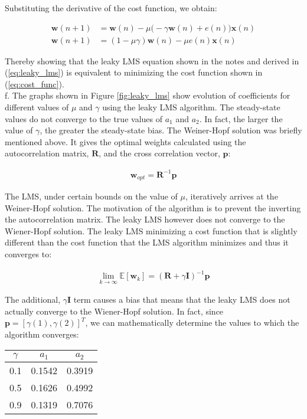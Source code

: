 \noindent{}Substituting the derivative of the cost function, we obtain:

\begin{align}
\textbf{w}(n+1) &= \textbf{w}(n) - \mu \Bigg(-\gamma \textbf{w}(n) + e(n)\Bigg)\textbf{x}(n) \nonumber\\
\textbf{w}(n+1) &= (1-\mu\gamma)\textbf{w}(n) - \mu e(n)\textbf{x}(n) \label{eq:leaky_lms}
\end{align}

\noindent{}Thereby showing that the leaky LMS equation shown in the notes and derived in (\ref{eq:leaky_lms}) is equivalent to minimizing the cost function shown in (\ref{eq:cost_func}).\\

\noindent{}f. The graphs shown in Figure \ref{fig:leaky_lms} show evolution of coefficients for different values of $\mu$ and $\gamma$ using the leaky LMS algorithm. The steady-state values do not converge to the true values of $a_1$ and $a_2$. In fact, the larger the value of $\gamma$, the greater the steady-state bias. The Weiner-Hopf solution was briefly mentioned above. It gives the optimal weights calculated using the autocorrelation matrix, $\textbf{R}$, and the cross correlation vector, $\textbf{p}$:

\begin{align*}
\textbf{w}_{opt} = \textbf{R}^{-1}\textbf{p}
\end{align*}

\noindent{}The LMS, under certain bounds on the value of $\mu$, iteratively arrives at the Weiner-Hopf solution. The motivation of the algorithm is to prevent the inverting the autocorrelation matrix. The leaky LMS however does not converge to the Wiener-Hopf solution. The leaky LMS minimizing a cost function that is slightly different than the cost function that the LMS algorithm minimizes and thus it converges to:

\begin{align*}
\lim_{k \rightarrow \infty} \mathbb{E}[\textbf{w}_{k}] = (\textbf{R} + \gamma\textbf{I})^{-1}\textbf{p}
\end{align*}

\noindent{}The additional, $\gamma\textbf{I}$ term causes a bias that means that the leaky LMS does not actually converge to the Wiener-Hopf solution. In fact, since $\textbf{p} = [\gamma(1), \gamma(2)]^T$, we can mathematically determine the values to which the algorithm converges:

\begin{table}[H]
\centering
\label{my-label}
\begin{tabular}{|c|c|c|}
\hline
$\gamma$ & $a_1$     & $a_2$     \\ \hline
0.1   & 0.1542 & 0.3919 \\ \hline
0.5   & 0.1626 & 0.4992 \\ \hline
0.9   & 0.1319 & 0.7076 \\ \hline
\end{tabular}
\end{table}

